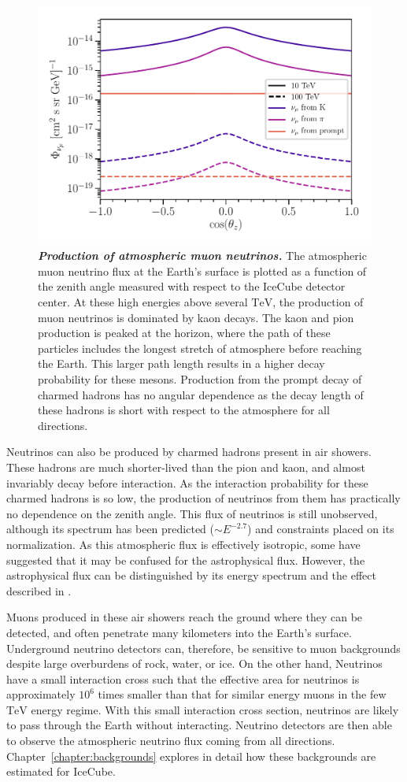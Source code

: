 \begin{figure}
	\centering
	\includegraphics[width=0.7\linewidth]{figures/atm_flux}
	\caption{\textbf{\textit{Production of atmospheric muon neutrinos.}}
		The atmospheric muon neutrino flux at the Earth's surface is plotted as a function of the zenith angle measured with respect to the IceCube detector center.
		At these high energies above several $\si\TeV$, the production of muon neutrinos is dominated by kaon decays.
		The kaon and pion production is peaked at the horizon, where the path of these particles includes the longest stretch of atmosphere before reaching the Earth.
		This larger path length results in a higher decay probability for these mesons.
		Production from the prompt decay of charmed hadrons has no angular dependence as the decay length of these hadrons is short with respect to the atmosphere for all directions.
	}\label{fig:atmo_zenith}
\end{figure}

Neutrinos can also be produced by charmed hadrons present in air showers.
These hadrons are much shorter-lived than the pion and kaon, and almost invariably decay before interaction.
As the interaction probability for these charmed hadrons is so low, the production of neutrinos from them has practically no dependence on the zenith angle.
This flux of neutrinos is still unobserved, although its spectrum has been predicted ($\sim E^{-2.7}$) and constraints placed on its normalization.
As this atmospheric flux is effectively isotropic, some have suggested that it may be confused for the astrophysical flux.
However, the astrophysical flux can be distinguished by its energy spectrum and the effect described in .

Muons produced in these air showers reach the ground where they can be detected, and often penetrate many kilometers into the Earth's surface.
Underground neutrino detectors can, therefore, be sensitive to muon backgrounds despite large overburdens of rock, water, or ice.
On the other hand, Neutrinos have a small interaction cross such that the effective area for neutrinos is approximately $10^6$ times smaller than that for similar energy muons in the few $\si\TeV$ energy regime.
With this small interaction cross section, neutrinos are likely to pass through the Earth without interacting.
Neutrino detectors are then able to observe the atmospheric neutrino flux coming from all directions.
Chapter~\ref{chapter:backgrounds} explores in detail how these backgrounds are estimated for IceCube.

